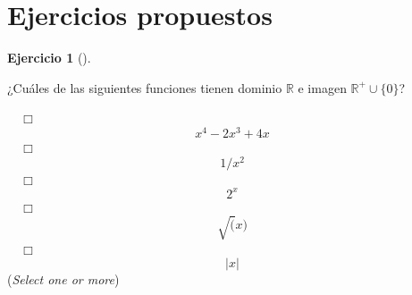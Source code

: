 \documentclass[
  a4paper,
]{scrreport}
\theoremstyle{definition}
\newtheorem{exercise}{Ejercicio}[chapter]
\theoremstyle{remark}
\begin{document}
\hypertarget{ejercicios-propuestos-1}{%
\section{Ejercicios propuestos}\label{ejercicios-propuestos-1}}

\leavevmode{}%
\begin{exercise}[]\label{exr-dominio-imagen}

¿Cuáles de las siguientes funciones tienen dominio \(\mathbb{R}\) e
imagen \(\mathbb{R}^+\cup\{0\}\)?

${\quad\Box}$ $$x^4-2x^3+4x$$
${\quad\Box}$ $$1/x^2$$
${\quad\Box}$ $$2^x$$
${\quad\Box}$ $$\sqrt(x)$$
${\quad\Box}$ $$|x|$$
(\emph{Select one or more})

\end{exercise}
\end{document}
